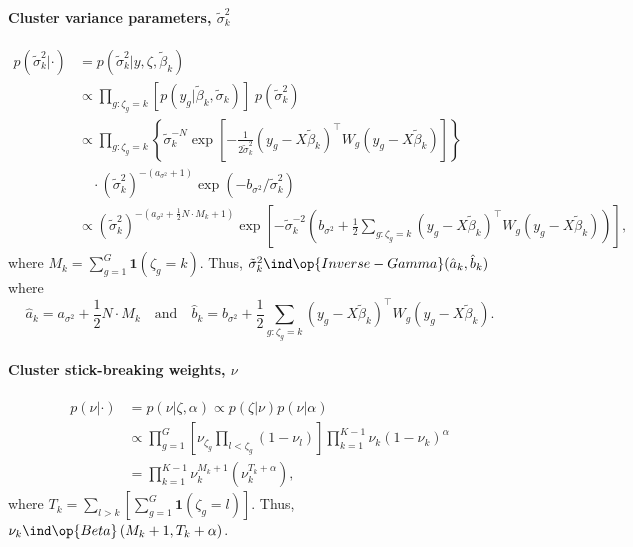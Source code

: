 \paragraph{Cluster variance parameters, $\tilde{\sigma}^2_k$}
\begin{align*}
p(\tilde{\sigma}^2_k|\cdot) & = p(\tilde{\sigma}^2_k|y, \zeta, \tilde{\beta}_k) \\
                            & \propto \prod_{g:\zeta_g=k} \left[ p(y_g|\tilde{\beta}_k, \tilde{\sigma}_k)\right]\; p(\tilde{\sigma}^2_k)\\
                            & \propto \prod_{g:\zeta_g=k}  \left\{ \tilde{\sigma}_k^{-N} \exp \left[ -\frac{1}{2\tilde{\sigma}^2_k} \left( y_g - X\tilde{\beta}_k \right)^\top W_g \left( y_g - X\tilde{\beta}_k \right) \right]\right\}\\
                            & \quad \cdot (\tilde{\sigma}_k^2)^{-(a_{\sigma^2}+1)} \exp\left(-b_{\sigma^2}/\tilde{\sigma}^2_k\right)\\
                            & \propto (\tilde{\sigma}_k^2)^{-(a_{\sigma^2} + \frac{1}{2}N\cdot M_k + 1)} \exp \left[ -\tilde{\sigma}_k^{-2} \left( b_{\sigma^2} + \frac{1}{2} \sum_{g:\zeta_g=k} \left( y_g - X\tilde{\beta}_k \right)^\top W_g \left( y_g - X\tilde{\beta}_k \right) \right) \right],
\end{align*}
where $M_k = \sum_{g=1}^G \bm{1}(\zeta_g=k)$.
Thus, $\tilde{\sigma}^2_k \ind \op{Inverse-Gamma}(\hat{a}_k, \hat{b}_k)$ where
\begin{equation*}
\hat{a}_k=a_{\sigma^2} + \frac{1}{2}N\cdot M_k \quad \mbox{and} \quad \hat{b}_k=b_{\sigma^2} + \frac{1}{2} \sum_{g:\zeta_g=k} \left( y_g - X\tilde{\beta}_k \right)^\top W_g \left( y_g - X\tilde{\beta}_k \right).
\end{equation*}

\paragraph{Cluster stick-breaking weights, $\nu$}
\begin{align*}
p(\nu|\cdot) & = p(\nu|\zeta,\alpha) \propto p(\zeta|\nu) p(\nu|\alpha)\\
& \propto \prod_{g=1}^G \left[ \nu_{\zeta_g} \prod_{l<\zeta_g}(1-\nu_l) \right] \prod_{k=1}^{K-1} \nu_k(1-\nu_k)^\alpha\\
& = \prod_{k=1}^{K-1} \nu_k^{M_k+1}(\nu_k^{T_k+\alpha}),
\end{align*}
where $T_k = \sum_{l>k}\left[\sum_{g=1}^G\bm{1}(\zeta_g=l)\right]$.
Thus, $\nu_k \ind \op{Beta}\left(M_k+1, T_k+\alpha\right)$.

